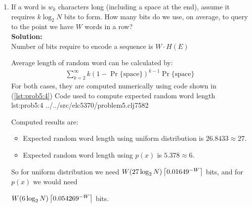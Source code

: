 \documentclass{assignment}
\begin{document}
\begin{enumerate}
\item If a word is $w_k$ characters long (including a space at the end), assume it requires $k \log_2 N$ bits to form.
  How many bits do we use, on average, to query to the point we have $W$ words in a row? \\
  \textbf{Solution:} \\
  Number of bits require to encode a sequence is $W \cdot H(E)$

  Average length of random word can be calculated by:
  \begin{align*}
    \sum_{k=2}^{\infty} k(1-\Pr\{\text{space}\})^{k-1}\Pr\{\text{space}\}
  \end{align*}
  For both cases, they are computed numerically using code shown in (\ref{lst:prob5:4})
  {Code used to compute expected random word length}
  {lst:prob5:4}
  {../../src/elc5370/problem5.clj}{75}{82}

  Computed results are:
  \begin{itemize}
    \item Expected random word length using uniform distribution is $26.8433 \approx 27$.
    \item Expected random word length using $p(x)$ is $5.378 \approx 6$.
  \end{itemize}

  So for uniform distribution we need $W(27\log_2N)\left \lceil 0.01649^{-W} \right \rceil$ bits, and for $p(x)$ we would need

  $W(6\log_2N)\left \lceil 0.054269^{-W} \right \rceil$ bits.
\end{enumerate}
\end{document}
